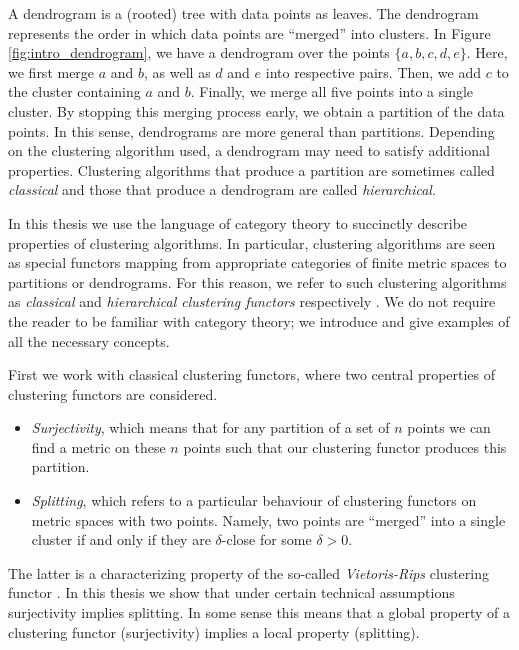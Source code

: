 A dendrogram is a (rooted) tree with data points as leaves.
The dendrogram represents the order in which data points are ``merged'' into clusters.
%
In Figure \ref{fig:intro_dendrogram}, we have a dendrogram over the points $\{a,b,c,d,e\}$.
Here, we first merge $a$ and $b$, as well as $d$ and $e$ into respective pairs.
Then, we add $c$ to the cluster containing $a$ and $b$.
Finally, we merge all five points into a single cluster.
%
By stopping this merging process early, we obtain a partition of the data points.
In this sense, dendrograms are more general than partitions. Depending on the clustering algorithm used, a dendrogram may need to satisfy additional properties.
Clustering algorithms that produce a partition are sometimes called \emph{classical} and those that produce a dendrogram are called \emph{hierarchical}.

In this thesis we use the language of category theory to succinctly describe properties of clustering algorithms. In particular, clustering algorithms are seen as special functors mapping from appropriate categories of finite metric spaces to partitions or dendrograms. For this reason, we refer to such clustering algorithms as \emph{classical} and \emph{hierarchical clustering functors} respectively \cite{Carlsson2010}. We do not require the reader to be familiar with category theory; we introduce and give examples of all the necessary concepts.


First we work with classical clustering functors, where two central properties of clustering functors are considered.
\begin{itemize}
    \item \emph{Surjectivity}, which means that for any partition of a set of $n$ points we can find a metric on these $n$ points such that our clustering functor produces this partition.
    \item \emph{Splitting}, which refers to a particular behaviour of clustering functors on metric spaces with two points. Namely, two points are ``merged'' into a single cluster if and only if they are $\delta$-close for some $\delta > 0$.
\end{itemize}

The latter is a characterizing property of the so-called \emph{Vietoris-Rips} clustering functor \cite[Thm.~6.4]{Carlsson2010}.
In this thesis we show that under certain technical assumptions surjectivity implies splitting. In some sense this means that a global property of a clustering functor (surjectivity) implies a local property (splitting).

